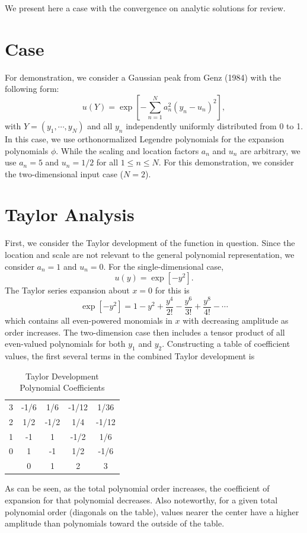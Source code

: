 \documentclass[11pt]{article}
\begin{document}
We present here a case with the convergence on analytic solutions for review.

\section{Case}
For demonstration, we consider a Gaussian peak from Genz (1984) with the following form:
\begin{equation}
  u(Y) = \exp[-\sum_{n=1}^N a_n^2(y_n-u_n)^2],
\end{equation}
with $Y = (y_1,\cdots,y_N)$ and all $y_n$ independently uniformly distributed from 0 to 1.  In this case, we use
orthonormalized Legendre polynomials for the expansion polynomials $\phi$.  While the scaling and location
factors $a_n$ and $u_n$ are arbitrary, we use $a_n = 5$ and $u_n = 1/2$ for all $1\leq n\leq N$.  For this
demonstration, we consider the two-dimensional input case ($N=2$).

\section{Taylor Analysis}
First, we consider the Taylor development of the function in question.  Since the location and scale are not
relevant to the general polynomial representation, we consider $a_n=1$ and $u_n=0$.  For the
single-dimensional case,
\begin{equation}
  u(y) = \exp[-y^2].
\end{equation}
The Taylor series expansion about $x=0$ for this is
\begin{equation}
  \exp[-y^2] = 1 - y^2 + \frac{y^4}{2!} - \frac{y^6}{3!} + \frac{y^8}{4!} -\cdots
\end{equation}
which contains all even-powered monomials in $x$ with decreasing amplitude as order increases.  The
two-dimension case then includes a tensor product of all even-valued polynomials for both $y_1$ and $y_2$.
Constructing a table of coefficient values, the first several terms in the combined Taylor development is
\begin{table}[H]
  \centering
  \caption{Taylor Development Polynomial Coefficients}
  \label{tab:taylor}
  \begin{tabular}{c|c c c c}
    3 & -1/6 &  1/6 & -1/12 &  1/36 \\
    2 &  1/2 & -1/2 &  1/4  & -1/12 \\
    1 & -1   &  1   & -1/2  &  1/6  \\
    0 &  1   & -1   &  1/2  & -1/6  \\ \hline
      &  0   &  1   &  2    &  3
  \end{tabular}
\end{table}
As can be seen, as the total polynomial order increases, the coefficient of expansion for that polynomial
decreases.  Also noteworthy,  for a given total polynomial order (diagonals on the table), values nearer the
center have a higher amplitude than polynomials toward the outside of the table.
\end{document}
